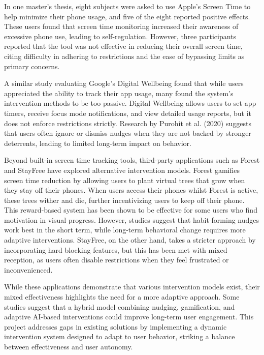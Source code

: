 \documentclass[10pt,twocolumn]{article}
\begin{document}
In one master’s thesis, eight subjects were asked to use Apple’s Screen Time to help minimize their phone usage, and five of the eight reported positive effects.\cite{DigitalDetox} These users found that screen time monitoring increased their awareness of excessive phone use, leading to self-regulation. However, three participants reported that the tool was not effective in reducing their overall screen time, citing difficulty in adhering to restrictions and the ease of bypassing limits as primary concerns.

A similar study evaluating Google’s Digital Wellbeing found that while users appreciated the ability to track their app usage, many found the system’s intervention methods to be too passive. \cite{ScreenPhysicalMentalWellbeing}Digital Wellbeing allows users to set app timers, receive focus mode notifications, and view detailed usage reports, but it does not enforce restrictions strictly. Research by Purohit et al. (2020) suggests that users often ignore or dismiss nudges when they are not backed by stronger deterrents, leading to limited long-term impact on behavior. \cite{PhoneAddictionAnxiety}

Beyond built-in screen time tracking tools, third-party applications such as Forest and StayFree have explored alternative intervention models. Forest gamifies screen time reduction by allowing users to plant virtual trees that grow when they stay off their phones.\cite{ScreenTimeDepression} When users access their phones whilst Forest is active, these trees wither and die, further incentivizing users to keep off their phone. This reward-based system has been shown to be effective for some users who find motivation in visual progress. However, studies suggest that habit-forming nudges work best in the short term, while long-term behavioral change requires more adaptive interventions. \cite{ScreenTimeInsomnia}StayFree, on the other hand, takes a stricter approach by incorporating hard blocking features, but this has been met with mixed reception, as users often disable restrictions when they feel frustrated or inconvenienced.

While these applications demonstrate that various intervention models exist, their mixed effectiveness highlights the need for a more adaptive approach. Some studies suggest that a hybrid model combining nudging, gamification, and adaptive AI-based interventions could improve long-term user engagement. \cite{DigitalDetoxWellbeing}This project addresses gaps in existing solutions by implementing a dynamic intervention system designed to adapt to user behavior, striking a balance between effectiveness and user autonomy.
\end{document}
